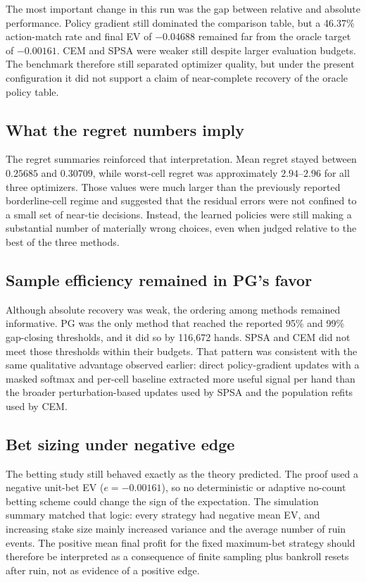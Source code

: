\documentclass[12pt]{article}
\begin{document}
The most important change in this run was the gap between relative and absolute
performance.  Policy gradient still dominated the comparison table, but a 46.37\%
action-match rate and final EV of $-0.04688$ remained far from the oracle target of
$-0.00161$.  CEM and SPSA were weaker still despite larger evaluation budgets.  The
benchmark therefore still separated optimizer quality, but under the present
configuration it did not support a claim of near-complete recovery of the oracle
policy table.

\subsection{What the regret numbers imply}

The regret summaries reinforced that interpretation.  Mean regret stayed between
$0.25685$ and $0.30709$, while worst-cell regret was approximately $2.94$--$2.96$ for
all three optimizers.  Those values were much larger than the previously reported
borderline-cell regime and suggested that the residual errors were not confined to a
small set of near-tie decisions.  Instead, the learned policies were still making a
substantial number of materially wrong choices, even when judged relative to the best
of the three methods.

\subsection{Sample efficiency remained in PG's favor}

Although absolute recovery was weak, the ordering among methods remained informative.
PG was the only method that reached the reported 95\% and 99\% gap-closing thresholds,
and it did so by 116,672 hands.  SPSA and CEM did not meet those thresholds within
their budgets.  That pattern was consistent with the same qualitative advantage
observed earlier: direct policy-gradient updates with a masked softmax and per-cell
baseline extracted more useful signal per hand than the broader perturbation-based
updates used by SPSA and the population refits used by CEM.

\subsection{Bet sizing under negative edge}

The betting study still behaved exactly as the theory predicted.  The proof used a
negative unit-bet EV ($e=-0.00161$), so no deterministic or adaptive no-count betting
scheme could change the sign of the expectation.  The simulation summary matched that
logic: every strategy had negative mean EV, and increasing stake size mainly increased
variance and the average number of ruin events.  The positive mean final profit for
the fixed maximum-bet strategy should therefore be interpreted as a consequence of
finite sampling plus bankroll resets after ruin, not as evidence of a positive edge.
\end{document}
